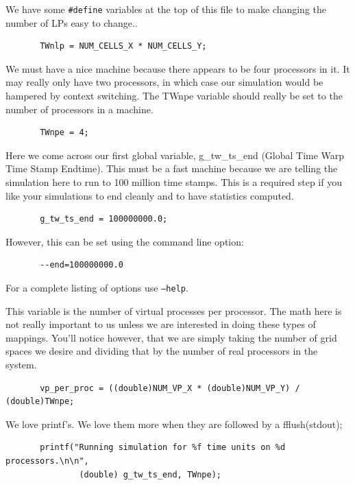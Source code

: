 \documentclass[12pt]{article}
\begin{document}
We have some {\tt \#define} variables at the top of this file to make
changing the number of LPs easy to change..

\begin{verbatim}      
       TWnlp = NUM_CELLS_X * NUM_CELLS_Y;
\end{verbatim}
 

We must have a nice machine because there appears to be four
processors in it.  It may really only have two processors, in which
case our simulation would be hampered by context switching.  The TWnpe
variable should really be set to the number of processors in a
machine.

\begin{verbatim}
       TWnpe = 4;
\end{verbatim}

Here we come across our first global variable, g\_tw\_ts\_end (Global
Time Warp Time Stamp Endtime).  This must be a fast machine because we
are telling the simulation here to run to 100 million time stamps.
This is a required step if you like your simulations to end cleanly
and to have statistics computed.

\begin{verbatim}
       g_tw_ts_end = 100000000.0;
\end{verbatim}

However, this can be set using the command line option:

\begin{verbatim}
       --end=100000000.0
\end{verbatim}

For a complete listing of options use {\tt --help}.

This variable is the number of virtual processes per processor. The math here
is not really important to us unless we are interested in doing these types of
mappings.  You'll notice however, that we are simply taking the number of grid
spaces we desire and dividing that by the number of real processors in the
system.
 
\begin{verbatim}
       vp_per_proc = ((double)NUM_VP_X * (double)NUM_VP_Y) / (double)TWnpe;
\end{verbatim}

We love printf's.  We love them more when they are followed by a fflush(stdout);
 
\begin{verbatim}
       printf("Running simulation for %f time units on %d processors.\n\n", 
               (double) g_tw_ts_end, TWnpe);
\end{verbatim}
 
\end{document}
